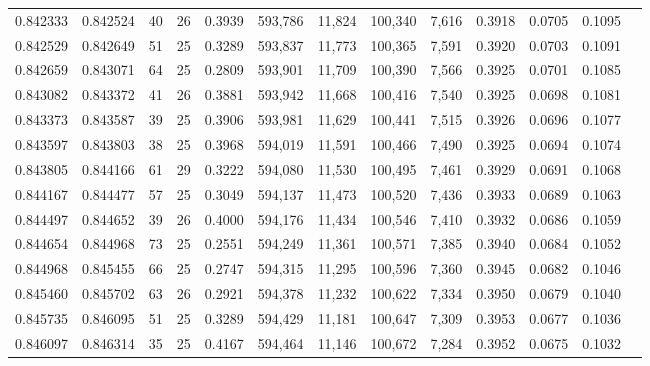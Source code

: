 \begin{tabular}{rrrrrrrrrrrrr}
0.842333 & 0.842524 &    40 &  26 &                                     0.3939 & 593,786 &  11,824 & 100,340 &   7,616 & 0.3918 & 0.0705 & 0.1095 \\
0.842529 & 0.842649 &    51 &  25 &                                     0.3289 & 593,837 &  11,773 & 100,365 &   7,591 & 0.3920 & 0.0703 & 0.1091 \\
0.842659 & 0.843071 &    64 &  25 &                                     0.2809 & 593,901 &  11,709 & 100,390 &   7,566 & 0.3925 & 0.0701 & 0.1085 \\
0.843082 & 0.843372 &    41 &  26 &                                     0.3881 & 593,942 &  11,668 & 100,416 &   7,540 & 0.3925 & 0.0698 & 0.1081 \\
0.843373 & 0.843587 &    39 &  25 &                                     0.3906 & 593,981 &  11,629 & 100,441 &   7,515 & 0.3926 & 0.0696 & 0.1077 \\
0.843597 & 0.843803 &    38 &  25 &                                     0.3968 & 594,019 &  11,591 & 100,466 &   7,490 & 0.3925 & 0.0694 & 0.1074 \\
0.843805 & 0.844166 &    61 &  29 &                                     0.3222 & 594,080 &  11,530 & 100,495 &   7,461 & 0.3929 & 0.0691 & 0.1068 \\
0.844167 & 0.844477 &    57 &  25 &                                     0.3049 & 594,137 &  11,473 & 100,520 &   7,436 & 0.3933 & 0.0689 & 0.1063 \\
0.844497 & 0.844652 &    39 &  26 &                                     0.4000 & 594,176 &  11,434 & 100,546 &   7,410 & 0.3932 & 0.0686 & 0.1059 \\
0.844654 & 0.844968 &    73 &  25 &                                     0.2551 & 594,249 &  11,361 & 100,571 &   7,385 & 0.3940 & 0.0684 & 0.1052 \\
0.844968 & 0.845455 &    66 &  25 &                                     0.2747 & 594,315 &  11,295 & 100,596 &   7,360 & 0.3945 & 0.0682 & 0.1046 \\
0.845460 & 0.845702 &    63 &  26 &                                     0.2921 & 594,378 &  11,232 & 100,622 &   7,334 & 0.3950 & 0.0679 & 0.1040 \\
0.845735 & 0.846095 &    51 &  25 &                                     0.3289 & 594,429 &  11,181 & 100,647 &   7,309 & 0.3953 & 0.0677 & 0.1036 \\
0.846097 & 0.846314 &    35 &  25 &                                     0.4167 & 594,464 &  11,146 & 100,672 &   7,284 & 0.3952 & 0.0675 & 0.1032 \\

\end{tabular}
